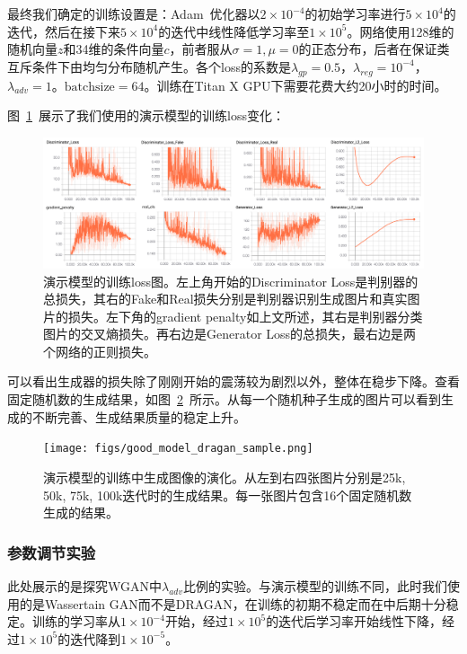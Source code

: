 \documentclass[a4paper,12pt,UTF8]{ctexart}
\newcommand{\kai}{\CJKfamily{zhkai}}	%
\begin{document}
最终我们确定的训练设置是：Adam~\cite{Kingma2014Adam}优化器以$2 \times 10^{-4}$的初始学习率进行$5 \times 10^{4}$的迭代，然后在接下来$5 \times 10^{4}$的迭代中线性降低学习率至$1 \times 10^{5}$。网络使用128维的随机向量$z$和34维的条件向量$c$，前者服从$\sigma=1, \mu=0$的正态分布，后者在保证类互斥条件下由均匀分布随机产生。各个loss的系数是$\lambda_{gp}=0.5$，$\lambda_{reg}=10^{-4}$，$\lambda_{adv}=1$。$\mathrm{batchsize}=64$。训练在Titan X GPU下需要花费大约20小时的时间。

图~\ref{fig:goodmodel_dragan}~展示了我们使用的演示模型的训练loss变化：

\begin{figure}[H]
  \centering
  \includegraphics[width=1\linewidth]{figs/good_model_dragan.png}
  \caption{\kai 演示模型的训练loss图。左上角开始的Discriminator Loss是判别器的总损失，其右的Fake和Real损失分别是判别器识别生成图片和真实图片的损失。左下角的gradient penalty如上文所述，其右是判别器分类图片的交叉熵损失。再右边是Generator Loss的总损失，最右边是两个网络的正则损失。}
  \label{fig:goodmodel_dragan}
\end{figure}

可以看出生成器的损失除了刚刚开始的震荡较为剧烈以外，整体在稳步下降。查看固定随机数的生成结果，如图~\ref{fig:dragan_evolve}~所示。从每一个随机种子生成的图片可以看到生成的不断完善、生成结果质量的稳定上升。

\begin{figure}[H]
  \centering
  \texttt{[image: figs/good\_model\_dragan\_sample.png]}
  \caption{\kai 演示模型的训练中生成图像的演化。从左到右四张图片分别是25k, 50k, 75k, 100k迭代时的生成结果。每一张图片包含16个固定随机数生成的结果。}
  \label{fig:dragan_evolve}
\end{figure}

\subsubsection{参数调节实验}

此处展示的是探究WGAN中$\lambda_{adv}$比例的实验。与演示模型的训练不同，此时我们使用的是Wassertain GAN而不是DRAGAN，在训练的初期不稳定而在中后期十分稳定。训练的学习率从$1 \times 10^{-4}$开始，经过$1 \times 10^{5}$的迭代后学习率开始线性下降，经过$1 \times 10^{5}$的迭代降到$1 \times 10^{-5}$。
\end{document}
